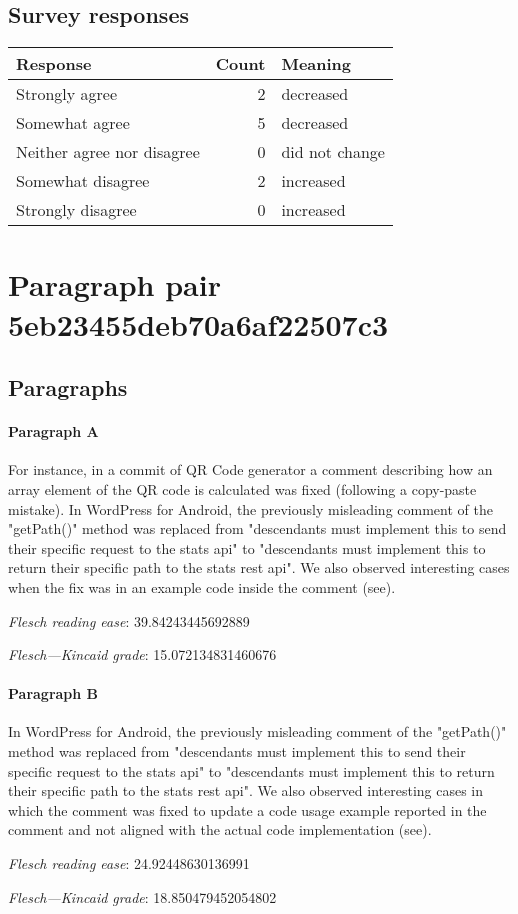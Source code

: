 \subsection{Survey responses}
\begin{tabular}{lrl}
\toprule
          \textbf{Response} &  \textbf{Count} & \textbf{Meaning} \\
\midrule
             Strongly agree &               2 &        decreased \\
             Somewhat agree &               5 &        decreased \\
 Neither agree nor disagree &               0 &   did not change \\
          Somewhat disagree &               2 &        increased \\
          Strongly disagree &               0 &        increased \\
\bottomrule
\end{tabular}

\section{Paragraph pair 5eb23455deb70a6af22507c3}
\subsection{Paragraphs}
\paragraph{Paragraph A}
For instance, in a commit of QR Code generator a comment describing how an array element of the QR code is calculated was fixed (following a copy-paste mistake). In WordPress for Android, the previously misleading comment of the "getPath()" method was replaced from "descendants must implement this to send their specific request to the stats api" to "descendants must implement this to return their specific path to the stats rest api". We also observed interesting cases when the fix was in an example code inside the comment (see).\par\medskip\emph{Flesch reading ease}: 39.84243445692889\par\emph{Flesch---Kincaid grade}: 15.072134831460676

\paragraph{Paragraph B}
In WordPress for Android, the previously misleading comment of the "getPath()" method was replaced from "descendants must implement this to send their specific request to the stats api" to "descendants must implement this to return their specific path to the stats rest api". We also observed interesting cases in which the comment was fixed to update a code usage example reported in the comment and not aligned with the actual code implementation (see).\par\medskip\emph{Flesch reading ease}: 24.92448630136991\par\emph{Flesch---Kincaid grade}: 18.850479452054802

